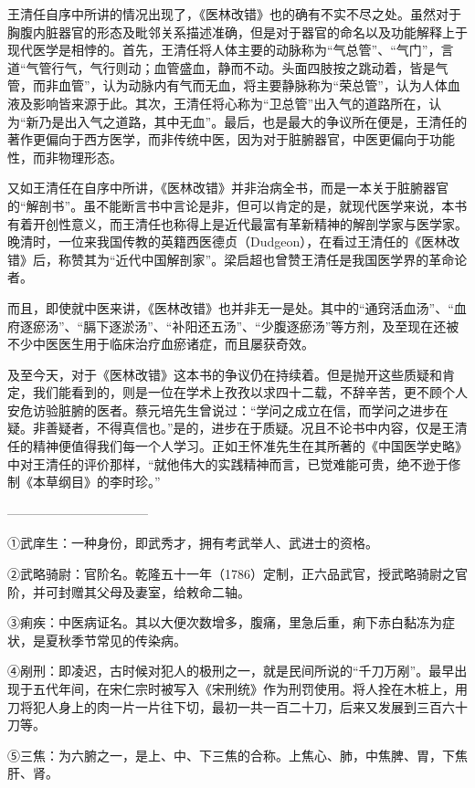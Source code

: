 \documentclass[a4paper,12pt,UTF8,twoside]{ctexbook}
\begin{document}
	王清任自序中所讲的情况出现了，《医林改错》也的确有不实不尽之处。虽然对于胸腹内脏器官的形态及毗邻关系描述准确，但是对于器官的命名以及功能解释上于现代医学是相悖的。首先，王清任将人体主要的动脉称为“气总管”、“气门”，言道“气管行气，气行则动；血管盛血，静而不动。头面四肢按之跳动着，皆是气管，而非血管”，认为动脉内有气而无血，将主要静脉称为“荣总管”，认为人体血液及影响皆来源于此。其次，王清任将心称为“卫总管”出入气的道路所在，认为“新乃是出入气之道路，其中无血”。最后，也是最大的争议所在便是，王清任的著作更偏向于西方医学，而非传统中医，因为对于脏腑器官，中医更偏向于功能性，而非物理形态。
	
	又如王清任在自序中所讲，《医林改错》并非治病全书，而是一本关于脏腑器官的“解剖书”。虽不能断言书中言论是非，但可以肯定的是，就现代医学来说，本书有着开创性意义，而王清任也称得上是近代最富有革新精神的解剖学家与医学家。晚清时，一位来我国传教的英籍西医德贞（Dudgeon），在看过王清任的《医林改错》后，称赞其为“近代中国解剖家”。梁启超也曾赞王清任是我国医学界的革命论者。
	
	而且，即使就中医来讲，《医林改错》也并非无一是处。其中的“通窍活血汤”、“血府逐瘀汤”、“膈下逐淤汤”、“补阳还五汤”、“少腹逐瘀汤”等方剂，及至现在还被不少中医医生用于临床治疗血瘀诸症，而且屡获奇效。
	
	及至今天，对于《医林改错》这本书的争议仍在持续着。但是抛开这些质疑和肯定，我们能看到的，则是一位在学术上孜孜以求四十二载，不辞辛苦，更不顾个人安危访验脏腑的医者。蔡元培先生曾说过：“学问之成立在信，而学问之进步在疑。非善疑者，不得真信也。”是的，进步在于质疑。况且不论书中内容，仅是王清任的精神便值得我们每一个人学习。正如王怀准先生在其所著的《中国医学史略》中对王清任的评价那样，“就他伟大的实践精神而言，已觉难能可贵，绝不逊于俢制《本草纲目》的李时珍。”
	
	---------------------------------
	
	①武庠生：一种身份，即武秀才，拥有考武举人、武进士的资格。
	
	②武略骑尉：官阶名。乾隆五十一年（1786）定制，正六品武官，授武略骑尉之官阶，并可封赠其父母及妻室，给敕命二轴。
	
	③痢疾：中医病证名。其以大便次数增多，腹痛，里急后重，痢下赤白黏冻为症状，是夏秋季节常见的传染病。
	
	④剐刑：即凌迟，古时候对犯人的极刑之一，就是民间所说的“千刀万剐”。最早出现于五代年间，在宋仁宗时被写入《宋刑统》作为刑罚使用。将人拴在木桩上，用刀将犯人身上的肉一片一片往下切，最初一共一百二十刀，后来又发展到三百六十刀等。
	
	⑤三焦：为六腑之一，是上、中、下三焦的合称。上焦心、肺，中焦脾、胃，下焦肝、肾。
	
\end{document}

